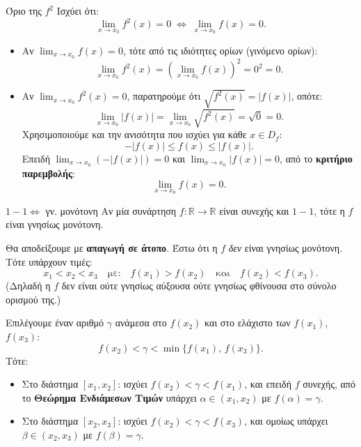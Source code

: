 \begin{Protashmabox}{Όριο της $f^2$}
Ισχύει ότι:
\[
  \lim_{x \to x_0} f^2(x) = 0 \;\Leftrightarrow\; \lim_{x \to x_0} f(x) = 0.
\]
\end{Protashmabox}
\apodeixi
\vspace{-5mm}
\begin{itemize}
  \item[$(\Rightarrow)$] Αν $\displaystyle\lim_{x \to x_0} f(x) = 0$, τότε από τις ιδιότητες
  ορίων (γινόμενο ορίων):
  \[
    \lim_{x \to x_0} f^2(x) = \left(\lim_{x \to x_0} f(x)\right)^2 = 0^2 = 0.
  \]

  \item[$(\Leftarrow)$] Αν $\displaystyle\lim_{x \to x_0} f^2(x) = 0$, παρατηρούμε ότι
  $\sqrt{f^2(x)} = |f(x)|$, οπότε:
  \[
    \lim_{x \to x_0} |f(x)| = \lim_{x \to x_0}\sqrt{f^2(x)} = \sqrt{0} = 0.
  \]
  Χρησιμοποιούμε και την ανισότητα που ισχύει για κάθε $x \in D_f$:
  \[
    -|f(x)| \leq f(x) \leq |f(x)|.
  \]
  Επειδή $\displaystyle\lim_{x \to x_0}(-|f(x)|) = 0$ και
  $\displaystyle\lim_{x \to x_0}|f(x)| = 0$, από το \textbf{κριτήριο παρεμβολής}:
  \[
    \lim_{x \to x_0} f(x) = 0.
  \]
\end{itemize}


\begin{Protashmabox}{$1-1\Leftrightarrow$ γν. μονότονη}
Αν μία συνάρτηση $f : \mathbb{R} \to \mathbb{R}$ είναι συνεχής και $1-1$, τότε η $f$ είναι γνησίως μονότονη.
\end{Protashmabox}
\apodeixi

Θα αποδείξουμε με \textbf{απαγωγή σε άτοπο}. Έστω ότι η $f$ \emph{δεν} είναι
γνησίως μονότονη. Τότε υπάρχουν τιμές:
\[
  x_1 < x_2 < x_3 \quad \text{με:} \quad f(x_1) > f(x_2) \quad \text{και} \quad f(x_2) < f(x_3).
\]
(Δηλαδή η $f$ δεν είναι ούτε γνησίως αύξουσα ούτε γνησίως φθίνουσα στο σύνολο ορισμού της.)

Επιλέγουμε έναν αριθμό $\gamma$ ανάμεσα στο $f(x_2)$ και στο ελάχιστο των $f(x_1)$, $f(x_3)$:
\[
  f(x_2) < \gamma < \min\{f(x_1),\, f(x_3)\}.
\]
Τότε:
\begin{itemize}
  \item Στο διάστημα $[x_1, x_2]$: ισχύει $f(x_2) < \gamma < f(x_1)$, και επειδή $f$ συνεχής,
        από το \textbf{Θεώρημα Ενδιάμεσων Τιμών} υπάρχει $\alpha \in (x_1, x_2)$ με $f(\alpha) = \gamma$.
  \item Στο διάστημα $[x_2, x_3]$: ισχύει $f(x_2) < \gamma < f(x_3)$, και ομοίως
        υπάρχει $\beta \in (x_2, x_3)$ με $f(\beta) = \gamma$.
\end{itemize}

